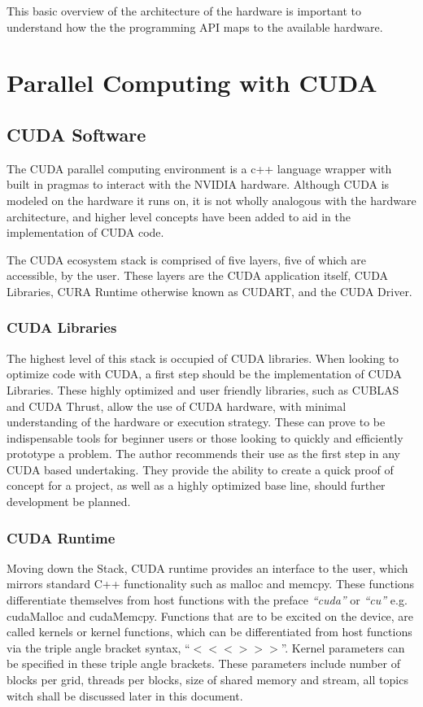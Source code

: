 This basic overview of the architecture of the hardware is important to understand
how the the programming API maps to the available hardware.


\section{Parallel Computing with CUDA}
\subsection{CUDA Software}

The CUDA parallel computing environment is a c++ language wrapper with built in
pragmas to interact with the NVIDIA hardware.  Although CUDA is modeled on the
hardware it runs on, it is not wholly analogous with the hardware architecture,
and higher level concepts have been added to aid in the implementation of CUDA code.
\par
The CUDA ecosystem stack is comprised of five layers, five of which are accessible, by the user.
These layers are the CUDA application itself, CUDA Libraries, CURA Runtime otherwise
known as CUDART, and the CUDA Driver.


\subsubsection{CUDA Libraries}

The highest level of this stack is occupied
of CUDA libraries. When looking to optimize code with CUDA, a
first step should be the implementation of CUDA Libraries.  These highly optimized
and user friendly libraries, such as CUBLAS and CUDA Thrust, allow the use of
CUDA hardware, with minimal understanding of the hardware or execution strategy.  These can prove
to be indispensable tools for beginner users or those looking to quickly and
efficiently prototype a problem. The author recommends their use as the first step
in any CUDA based undertaking. They provide the ability to create a quick proof
of concept for a project, as well as a highly optimized base line, should further
development be planned.
\subsubsection{CUDA Runtime}

Moving down the Stack, CUDA runtime provides an interface to the user, which mirrors
standard C++ functionality such as malloc and memcpy.  These functions differentiate
themselves from host functions with the preface \textit{``cuda''} or \textit{``cu''}
e.g. cudaMalloc and cudaMemcpy.  Functions that are to be excited on the
device, are called kernels or kernel functions, which can be differentiated from
host functions via the triple angle bracket syntax, ``$<<< >>>$''.
Kernel parameters can be specified in these triple angle brackets.  These parameters
include number of blocks per grid, threads per blocks, size of shared memory and
stream, all topics witch shall be discussed later in this document. %

